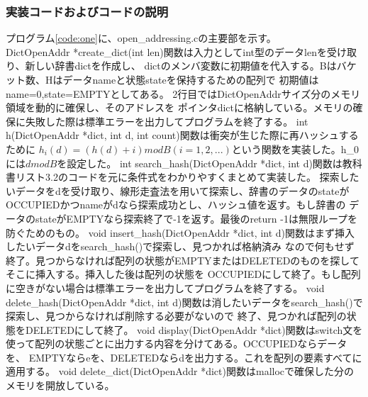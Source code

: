 \documentclass{ltjsarticle}
\begin{document}
\subsubsection{実装コードおよびコードの説明}\label{subsubsec:実装コードおよびコードの説明1}
プログラム\ref{code:one}に、open\_addressing.cの主要部を示す。 \\ \indent
DictOpenAddr *create\_dict(int len)関数は入力としてint型のデータlenを受け取り、新しい辞書dictを作成し、
dictのメンバ変数に初期値を代入する。Bはバケット数、Hはデータnameと状態stateを保持するための配列で
初期値はname=0,state=EMPTYとしてある。
2行目ではDictOpenAddrサイズ分のメモリ領域を動的に確保し、そのアドレスを
ポインタdictに格納している。メモリの確保に失敗した際は標準エラーを出力してプログラムを終了する。
int h(DictOpenAddr *dict, int d, int count)関数は衝突が生じた際に再ハッシュするために
$h_i(d) = (h(d) + i) mod B (i = 1,2,...)$という関数を実装した。h\_0には$d mod B$を設定した。
int search\_hash(DictOpenAddr *dict, int d)関数は教科書リスト3.2のコードを元に条件式をわかりやすくまとめて実装した。
探索したいデータをdを受け取り、線形走査法を用いて探索し、辞書のデータのstateがOCCUPIEDかつnameがdなら探索成功とし、ハッシュ値を返す。もし辞書の
データのstateがEMPTYなら探索終了で-1を返す。最後のreturn -1は無限ループを防ぐためのもの。
void insert\_hash(DictOpenAddr *dict, int d)関数はまず挿入したいデータdをsearch\_hash()で探索し、見つかれば格納済み
なので何もせず終了。見つからなければ配列の状態がEMPTYまたはDELETEDのものを探してそこに挿入する。挿入した後は配列の状態を
OCCUPIEDにして終了。もし配列に空きがない場合は標準エラーを出力してプログラムを終了する。
void delete\_hash(DictOpenAddr *dict, int d)関数は消したいデータをsearch\_hash()で探索し、見つからなければ削除する必要がないので
終了、見つかれば配列の状態をDELETEDにして終了。
void display(DictOpenAddr *dict)関数はswitch文を使って配列の状態ごとに出力する内容を分けてある。OCCUPIEDならデータを、
EMPTYならeを、DELETEDならdを出力する。これを配列の要素すべてに適用する。
void delete\_dict(DictOpenAddr *dict)関数はmallocで確保した分のメモリを開放している。
\end{document}
